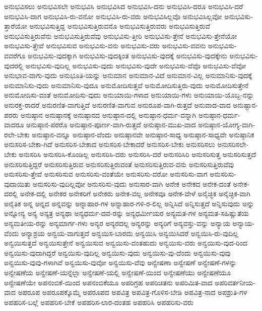 {ಅನುಭವಿಸಲು
ಅನುಭವಿಸಲೇ
ಅನುಭವಿಸಿ
ಅನುಭವಿಸಿದ
ಅನುಭವಿಸಿ-ದನು
ಅನುಭವಿಸಿ-ದರೂ
ಅನುಭವಿಸಿ-ದರೆ
ಅನುಭವಿಸಿ-ದಾಗ
ಅನುಭವಿಸಿ-ರು-ವನೋ
ಅನುಭವಿಸಿ-ರು-ವರು
ಅನುಭವಿಸಿಲ್ಲವೊ
ಅನುಭವಿಸಿಲ್ಲವೋ
ಅನುಭವಿಸು-ತ್ತಾರೆಯೋ
ಅನುಭವಿಸುತ್ತಿದ್ದ
ಅನುಭವಿಸುತ್ತಿರುವನೊ
ಅನುಭವಿಸುತ್ತಿರುವರು
ಅನುಭವಿಸುತ್ತಿರುವೆ
ಅನುಭವಿಸುತ್ತಿರುವೆನು
ಅನುಭವಿಸುತ್ತಿರುವೆವು
ಅನುಭವಿಸು-ತ್ತೀರಿ
ಅನುಭವಿಸು-ತ್ತೇನೆ
ಅನುಭವಿಸು-ತ್ತೇನೆಯೋ
ಅನುಭವಿಸು-ತ್ತೇವೆ
ಅನುಭವಿಸುವ
ಅನುಭವಿಸು-ವನು
ಅನುಭವಿಸು-ವರು
ಅನುಭವಿಸು-ವವನು
ಅನುಭವಿಸು-ವವರೆಗೂ
ಅನುಭವಿಸು-ವುದಕ್ಕಾಗಿ
ಅನುಭವಿಸು-ವುದಕ್ಕಿಂತ
ಅನುಭವಿಸು-ವುದಕ್ಕೆ
ಅನುಭವಿಸು-ವುದಕ್ಕೇನು
ಅನುಭವಿಸು-ವುದರಲ್ಲಿ
ಅನುಭವಿಸು-ವುದಿಲ್ಲ
ಅನುಭವಿಸು-ವುದು
ಅನುಭವಿಸು-ವುದೇ
ಅನುಭವಿಸು-ವೆವೊ
ಅನುಭವಿಸು-ವೆವೋ
ಅನುಭಾವ-ವಾಗು-ವುದು
ಅನುಭೂತಿ-ಯನ್ನು
ಅನುಮಾನ
ಅನುಮಾನ-ವಿದೆ
ಅನುಮಾನ-ವಿಲ್ಲ
ಅನುಮಾನಿಸು-ವುದಕ್ಕೆ
ಅನುಮಾನಿಸು-ವುದು
ಅನುಮಾನಿಸು-ವುದೂ
ಅನುಮೋದಿಸುತ್ತವೆ
ಅನುಮೋದಿಸುತ್ತಿರು-ವುದು
ಅನುಮೋದಿಸುತ್ತೇನೆ
ಅನುಮೋದಿಸು-ವಂತೆ
ಅನುಮೋದಿಸು-ವುದು
ಅನುಯಾಯಿ-ಗಳಾದ
ಅನುಯಾಯಿ-ಗಳು
ಅನುಯಾಯಿ-ಯೊಬ್ಬ-ನನ್ನು
ಅನುರಕ್ತ-ರಾದರೆ
ಅನುರಣಿತ-ವಾಗುತ್ತಿದೆ
ಅನುರಣಿತ-ವಾಗುವ
ಅನುರೂಪ-ವಾಗಿ-ರುತ್ತದೆ
ಅನುವಾದ-ವಾದ
ಅನುಷ್ಟಾನ-ಪರರು
ಅನುಷ್ಠಾನ
ಅನುಷ್ಠಾನಕ್ಕೆ
ಅನುಷ್ಠಾನದ
ಅನುಷ್ಠಾನ-ದಲ್ಲಿ
ಅನುಷ್ಠಾನ-ಧರ್ಮ-ವನ್ನಾಗಿ
ಅನುಷ್ಠಾನ-ಧರ್ಮ-ವಾದರೂ
ಅನುಷ್ಠಾನ-ಪರರೊ
ಅನುಷ್ಠಾನ-ಪೂರ್ಣ-ವಾಗಿ-ರುತ್ತದೆ
ಅನುಷ್ಠಾನ-ಮುಖ-ವಾದ
ಅನುಷ್ಠಾನ-ಯೋಗ್ಯ-ವಾಗಿ-ರಲೇ-ಬೇಕು
ಅನುಷ್ಠಾನ-ವನ್ನೂ
ಅನುಷ್ಠಾನ-ವೆಂದು
ಅನುಷ್ಠಾನವೇ
ಅನುಷ್ಠಾನ-ಸಾಧ್ಯ
ಅನುಷ್ಠಾನ-ಸಾಧ್ಯವೇ
ಅನುಷ್ಠಾನಿಕ
ಅನುಸರಿಸ-ಬೇಕಾ-ಗಿದೆ
ಅನುಸರಿಸ-ಬೇಕಾದ
ಅನುಸರಿಸ-ಬೇಕಾದರೆ
ಅನುಸರಿಸ-ಬೇಕು
ಅನುಸರಿಸಲು
ಅನುಸರಿಸಲೇ-ಬೇಕು
ಅನುಸರಿಸಿ
ಅನುಸರಿಸಿ-ಕೊಂಡಿಲ್ಲ
ಅನುಸರಿಸಿ-ದರು
ಅನುಸರಿಸಿ-ದರೆ
ಅನುಸರಿಸಿರಿ
ಅನುಸರಿಸುತ್ತ
ಅನುಸರಿಸುತ್ತದೆ
ಅನುಸರಿಸುತ್ತಿದ್ದರೆ
ಅನುಸರಿಸುತ್ತಿರುವ
ಅನುಸರಿಸುತ್ತಿರುವಂತೆ
ಅನುಸರಿಸುತ್ತಿರುವ-ವನು
ಅನುಸರಿಸುತ್ತಿರುವೆವು
ಅನುಸರಿಸು-ತ್ತೇವೆ
ಅನುಸರಿಸುವ
ಅನುಸರಿಸು-ವಂತೆಯೇ
ಅನುಸರಿಸು-ವರೋ
ಅನುಸರಿಸು-ವಾಗ
ಅನುಸರಿಸು-ವುದಾಯಿತು
ಅನುಸರಿಸು-ವುದಿಲ್ಲವೋ
ಅನುಸರಿಸು-ವುದು
ಅನುಸಾರ-ವಾಗಿ
ಅನೇಕ
ಅನೇಕದ
ಅನೇಕ-ದಂತೆ
ಅನೇಕ-ದರಲ್ಲಿ
ಅನೇಕ-ದಲ್ಲಿ
ಅನೇಕರ
ಅನೇಕರಿಗೆ
ಅನೇಕರು
ಅನೇಕ-ವಲ್ಲ
ಅನೇಕವೂ
ಅನೇಕ-ವೇಳೆ
ಅನೈಚ್ಛಿಕ
ಅನೈಚ್ಛಿಕ-ವಾಗಿ
ಅನೈತಿಕ
ಅನ್ನ
ಅನ್ನದ
ಅನ್ನವನ್ನು
ಅನ್ನಾಹಾರ-ಗಳ
ಅನ್ನಾಹಾರ-ಗಳಿ-ರ-ಲಿಲ್ಲ
ಅನ್ನಿಸಿದೆ
ಅನ್ನಿಸುತ್ತದೆ
ಅನ್ನಿಸುವುದು
ಅನ್ನು
ಅನ್ನೋನ್ಯ
ಅನ್ಯ
ಅನ್ಯತ್ರ
ಅನ್ಯಥಾ
ಅನ್ಯಧರ್ಮ-ದವ-ರನ್ನು
ಅನ್ಯಧರ್ಮೀಯರ
ಅನ್ಯಮತ-ಗಳ
ಅನ್ಯಮತ-ಸಹಿಷ್ಣುತೆಯ
ಅನ್ಯಮತೀಯ-ರನ್ನು
ಅನ್ಯಮಾರ್ಗ-ಗಳು
ಅನ್ಯರ
ಅನ್ಯರದಲ್ಲ
ಅನ್ಯರನ್ನು
ಅನ್ಯರಿಗೆ
ಅನ್ಯವಸ್ತು-ವನ್ನು
ಅನ್ಯಾಯ
ಅನ್ಯಾಯ-ವೆಂದು
ಅನ್ಯಾಶ್ರಯ
ಅನ್ವಯ-ವಾಗುತ್ತದೆ
ಅನ್ವಯಿಸ-ಬಾರದು
ಅನ್ವಯಿಸಿ
ಅನ್ವಯಿಸಿದರೆ
ಅನ್ವಯಿಸಿ-ರು-ವುದಿಲ್ಲ
ಅನ್ವಯಿಸುತ್ತದೆ
ಅನ್ವಯಿಸುತ್ತೇನೆ
ಅನ್ವಯಿಸುವ
ಅನ್ವಯಿಸು-ವಂತಹುದು
ಅನ್ವಯಿಸು-ವರು
ಅನ್ವಯಿಸು-ವುದ-ರಿಂದ
ಅನ್ವಯಿಸು-ವುದಾಗಿದ್ದರೆ
ಅನ್ವಯಿಸು-ವುದಿಲ್ಲ
ಅನ್ವಯಿಸು-ವುದು
ಅನ್ವಯಿಸು-ವು-ದೆಂದು
ಅನ್ವಯಿಸು-ವುವು
ಅನ್ವಯಿಸು-ವುವು-ಗಳಾಗಿವೆ
ಅನ್ವಯಿಸು-ವುವೋ
ಅನ್ವಯಿಸು-ವೆವು
ಅನ್ವೇಷಣಾ
ಅನ್ವೇಷಣೆ
ಅನ್ವೇಷಣೆ-ಗಳನ್ನು
ಅನ್ವೇಷಣೆಯ
ಅನ್ವೇಷಣೆ-ಯನ್ನೆಲ್ಲಾ
ಅನ್ವೇಷಣೆ-ಯಲ್ಲಿ
ಅನ್ವೇಷಣೆ-ಯಿಂದ
ಅನ್ವೇಷಣೆಯು
ಅನ್ವೇಷಣೆಯೂ
ಅನ್ವೇಷಣೆಯೇ
ಅಪನಂಬಿಕೆ-ಯಿಂದ
ಅಪನಂಬಿಕೆಯೂ
ಅಪರಿಗ್ರಹ
ಅಪರಿಚಿತನು
ಅಪರಿಮಿತ-ವಾದ
ಅಪರಿವರ್ತನೀಯ-ವಾದ
ಅಪರೂಪ
ಅಪರೂಪಕ್ಕೊಮ್ಮೆ
ಅಪರೂಪದ
ಅಪವಿತ್ರ
ಅಪವಿತ್ರ-ಗೊಳಿಸ-ಬೇಡಿ
ಅಪವಿತ್ರ-ನಾದ
ಅಪಶ್ರುತಿ-ಗಳ
ಅಪಹರಿಸ-ಬಲ್ಲೆ
ಅಪಹರಿಸ-ಬೇಕೆ
ಅಪಹರಿಸ-ಲಾರ-ದಂತಹ
ಅಪಹರಿಸಿ
ಅಪಹರಿಸು-ವರು
}

